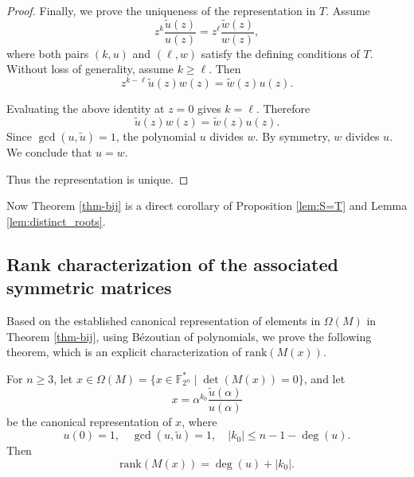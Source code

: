 \documentclass[hidelinks,onefignum,onetabnum]{siamart251216}
\theoremstyle{definition}
\theoremstyle{remark}
\providecommand{\rank}{{\mathrm{rank}}}
\begin{document}
\begin{proof}
	\medskip
	
	Finally, we prove the uniqueness of the representation in $T$.
	Assume
	\[
	z^k\frac{\widetilde{u}(z)}{u(z)}
	=
	z^\ell\frac{\widetilde{w}(z)}{w(z)},
	\]
	where both pairs $(k,u)$ and $(\ell,w)$ satisfy the defining conditions of $T$.
	Without loss of generality, assume $k\ge \ell$. Then
	\[
	z^{k-\ell}\widetilde{u}(z)w(z)=\widetilde{w}(z)u(z).
	\]
	
	Evaluating the above identity at $z=0$ gives $k=\ell$. Therefore
	\[
	\widetilde{u}(z)w(z)=\widetilde{w}(z)u(z).
	\]
	Since $\gcd(u,\widetilde{u})=1$, the polynomial $u$ divides $w$. By symmetry, $w$ divides $u$. We conclude that $u=w$.
	
	Thus the representation is unique.
\end{proof}


Now Theorem \ref{thm-bij} is a direct corollary of Proposition \ref{lem:S=T} and Lemma \ref{lem:distinct_roots}. 


\subsection{Rank characterization of the associated symmetric matrices}
Based on the established canonical representation of elements in $\Omega(M)$ in Theorem \ref{thm-bij}, using B{\'e}zoutian of polynomials, we prove the following theorem, which is an explicit characterization of $\rank(M(x))$.



\begin{theorem}\label{prop:rank-formula}
	For $n\ge 3$, let $x\in \Omega (M)=\{ x\in\mathbb F_{2^n}^*\mid \det (M(x))=0\}$, and let
	\[
	x=\alpha^{k_0}\frac{\widetilde{u}(\alpha)}{u(\alpha)}
	\]
	be the canonical representation of $x$, where
	\[
	u(0)=1,\quad \gcd(u,\widetilde{u})=1,\quad |k_0|\le n-1-\deg(u).
	\]
	Then
	\[
	\rank(M(x))=\deg(u)+|k_0|.
	\]
\end{theorem}
\end{document}
